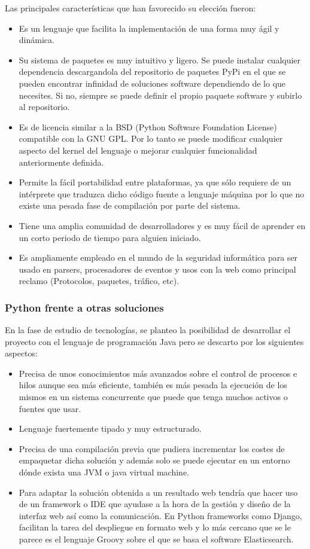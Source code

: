 Las principales características que han favorecido su elección fueron:
\begin{itemize}
\item Es un lenguaje que facilita la implementación de una forma muy ágil y dinámica.
\item Su sistema de paquetes es muy intuitivo y ligero. Se puede instalar cualquier dependencia descargandola del repositorio de paquetes PyPi en el que se pueden encontrar infinidad de soluciones software dependiendo de lo que necesites. Si no, siempre se puede definir el propio paquete software y subirlo al repositorio.
\item Es de licencia similar a la BSD (Python Software Foundation License) compatible con la GNU GPL. Por lo tanto se puede modificar cualquier aspecto del kernel del lenguaje o mejorar cualquier funcionalidad anteriormente definida.
\item Permite la fácil portabilidad entre plataformas, ya que sólo requiere de un intérprete que traduzca dicho código fuente a lenguaje máquina por lo que no existe una pesada fase de compilación por parte del sistema.
\item Tiene una amplia comunidad de desarrolladores y es muy fácil de aprender en un corto periodo de tiempo para alguien iniciado.
\item Es ampliamente empleado en el mundo de la seguridad informática para ser usado en parsers, procesadores de eventos y usos con la web como principal reclamo (Protocolos, paquetes, tráfico, etc).
\end{itemize}


\subsubsection{Python frente a otras soluciones}

En la fase de estudio de tecnologías, se planteo la posibilidad de desarrollar el proyecto con el lenguaje de programación Java pero se descarto por los siguientes aspectos:

\begin{itemize}
\item Precisa de unos conocimientos más avanzados sobre el control de procesos e hilos aunque sea más eficiente, también es más pesada la ejecución de los mismos en un sistema concurrente que puede que tenga muchos activos o fuentes que usar.
\item Lenguaje fuertemente tipado y muy estructurado.
\item Precisa de una compilación previa que pudiera incrementar los costes de empaquetar dicha solución y además solo se puede ejecutar en un entorno dónde exista una JVM o java virtual machine.
\item Para adaptar la solución obtenida a un resultado web tendría que hacer uso de un framework o IDE que ayudase a la hora de la gestión y diseño de la interfaz web así como la comunicación. En Python frameworks como Django, facilitan la tarea del despliegue en formato web y lo más cercano que se le parece es el lenguaje Groovy sobre el que se basa el software Elasticsearch.
\end{itemize}

